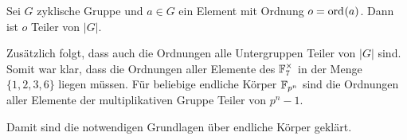 \begin{satz}
    Sei $G$ zyklische Gruppe und $a \in G$ ein Element mit Ordnung $o = \ord{a}$. Dann ist $o$ Teiler von $|G|$.
\end{satz}

Zusätzlich folgt, dass auch die Ordnungen alle Untergruppen Teiler von $|G|$ sind. Somit war klar, dass die Ordnungen aller Elemente des $\field{7}^\times$ in der Menge $\{1,2,3,6\}$ liegen müssen. Für beliebige endliche Körper $\field{p}[n]$ sind die Ordnungen aller Elemente der multiplikativen Gruppe Teiler von $p^n-1$.

Damit sind die notwendigen Grundlagen über endliche Körper geklärt. 

\begin{comment}
\begin{enumerate}
    \item Abschnitt Einfache endliche Körper:
    \item Definition: Restklassenring $\mathbb{Z}_n$
    \item Satz: $\mathbb{Z}_n$ ist Ring
    \item Satz: $\mathbb{Z}_p$ ist Körper für $p$ Primzahl
    \item (Satz von Fermat)    
    
    \item Abschnitt Polynomringe:
    \item Definition: Polynom
    \item Satz: Division mit Rest existiert (2.6)
    \item Satz: Polynomringe (${\field{p}}[X]$ und ${\field{p}}_{N} [X]$) sind Ringe    
    
    \item Abschnitt Endliche Körper:
    \item Teiler und Irreduzible Polynome
    \item Satz: ${\field{p}}_{N} [X]$ ist Körper für N irreduzibel (3.7)
    \item Satz: Existenzsatz (10.4)
    \item Satz: Eindeutigkeitssatz (10.9)
    
    \item Abschnitt zyklische Gruppe:
    \item Definition: zyklische Gruppe (6.4)
    \item Satz: Zyklische Gruppe besitzt primitives Element
    \item Potenzgesetze
    \item Satz: Multiplikative Gruppe ${\field{p}}^{\ast}$ und ihre Untergruppen sind zyklisch (7.2)
    \item (Potenzen bilden Untergruppe (6.4))
    \item Definition: Ordnung eines Elements (/ einer Gruppe)
    \item Satz: Potenzen sind zyklisch (6.8)
    \item Satz: Elemente bilden eigene Untergruppe mit Ordnung als Teiler (6.9)
\end{enumerate}
\end{comment}